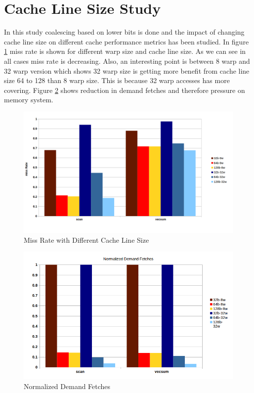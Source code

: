 \documentclass{article}
\begin{document}
\section{Cache Line Size Study}
In this study coalescing based on lower bits is done and the impact of changing cache line size on different cache performance metrics has been studied. In figure \ref{cachelinesize} miss rate is shown for different warp size and cache line size. As we can see in all cases miss rate is decreasing. Also, an interesting point is between 8 warp and 32 warp version which shows 32 warp size is getting more benefit from cache line size 64 to 128 than 8 warp size. This is because 32 warp accesses has more covering. Figure \ref{demandfetches} shows reduction in demand fetches and therefore pressure on memory system.

\begin{figure}[h!]
  \centering
  \includegraphics[width=1.0\textwidth]{cachelinesize_1.png}
  \caption{Miss Rate with Different Cache Line Size}
  \label{cachelinesize}
\end{figure}

\begin{figure}[h!]
  \centering
  \includegraphics[width=1.0\textwidth]{demandfetches.png}
  \caption{Normalized Demand Fetches}
  \label{demandfetches}
\end{figure}
\end{document}
